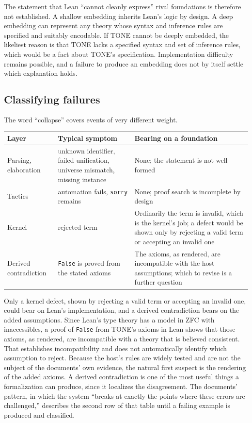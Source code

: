 \documentclass[11pt]{article}
\begin{document}
The statement that Lean ``cannot cleanly express'' rival foundations is therefore not established. A shallow embedding inherits Lean's logic by design. A deep embedding can represent any theory whose syntax and inference rules are specified and suitably encodable. If TONE cannot be deeply embedded, the likeliest reason is that TONE lacks a specified syntax and set of inference rules, which would be a fact about TONE's specification. Implementation difficulty remains possible, and a failure to produce an embedding does not by itself settle which explanation holds.

\subsection{Classifying failures}
\label{sec:fail}

The word ``collapse'' covers events of very different weight.

\begin{center}
\small
\begin{tabular}{@{}>{\raggedright\arraybackslash}p{}>{\raggedright\arraybackslash}p{}>{\raggedright\arraybackslash}p{}@{}}
\toprule
Layer & Typical symptom & Bearing on a foundation \\
\midrule
Parsing, elaboration & unknown identifier, failed unification, universe mismatch, missing instance & None; the statement is not well formed \\
Tactics & automation fails, \texttt{sorry} remains & None; proof search is incomplete by design \\
Kernel & rejected term & Ordinarily the term is invalid, which is the kernel's job; a defect would be shown only by rejecting a valid term or accepting an invalid one \\
Derived contradiction & \texttt{False} is proved from the stated axioms & The axioms, as rendered, are incompatible with the host assumptions; which to revise is a further question \\
\bottomrule
\end{tabular}
\end{center}

Only a kernel defect, shown by rejecting a valid term or accepting an invalid one, could bear on Lean's implementation, and a derived contradiction bears on the added assumptions. Since Lean's type theory has a model in ZFC with inaccessibles, a proof of \texttt{False} from TONE's axioms in Lean shows that those axioms, as rendered, are incompatible with a theory that is believed consistent. That establishes incompatibility and does not automatically identify which assumption to reject. Because the host's rules are widely tested and are not the subject of the documents' own evidence, the natural first suspect is the rendering of the added axioms. A derived contradiction is one of the most useful things a formalization can produce, since it localizes the disagreement. The documents' pattern, in which the system ``breaks at exactly the points where these errors are challenged,'' describes the second row of that table until a failing example is produced and classified.
\end{document}
